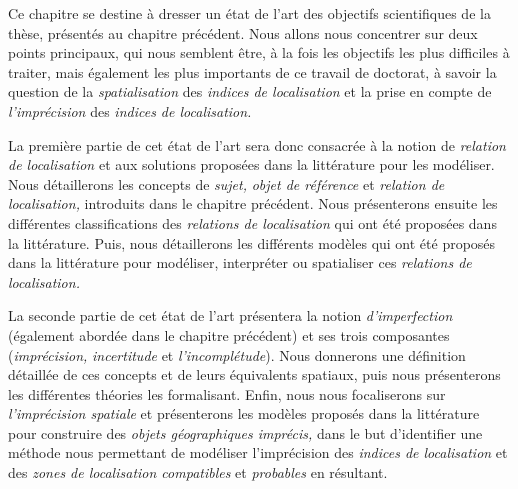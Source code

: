 Ce chapitre se destine à dresser un état de l'art des objectifs
scientifiques de la thèse, présentés au chapitre précédent. Nous
allons nous concentrer sur deux points principaux, qui nous semblent
être, à la fois les objectifs les plus difficiles à traiter, mais
également les plus importants de ce travail de doctorat, à savoir la
question de la \emph{spatialisation} des \emph{indices de
  localisation} et la prise en compte de \emph{l'imprécision} des
\emph{indices de localisation.}

La première partie de cet état de l'art sera donc consacrée à la
notion de \emph{relation de localisation} et aux solutions proposées
dans la littérature pour les modéliser. Nous détaillerons les concepts
de \emph{sujet,} \emph{objet de référence} et \emph{relation de
  localisation,} introduits dans le chapitre précédent. Nous
présenterons ensuite les différentes classifications des
\emph{relations de localisation} qui ont été proposées dans la
littérature. Puis, nous détaillerons les différents modèles qui ont
été proposés dans la littérature pour modéliser, interpréter ou
spatialiser ces \emph{relations de localisation.}

La seconde partie de cet état de l'art présentera la notion
\emph{d'imperfection} (également abordée dans le chapitre précédent)
et ses trois composantes (\emph{imprécision,} \emph{incertitude} et
\emph{l'incomplétude}). Nous donnerons une définition détaillée de ces
concepts et de leurs équivalents spatiaux, puis nous présenterons les
différentes théories les formalisant. Enfin, nous nous focaliserons
sur \emph{l'imprécision spatiale} et présenterons les modèles proposés
dans la littérature pour construire des \emph{objets géographiques
  imprécis,} dans le but d'identifier une méthode nous permettant de
modéliser l'imprécision des \emph{indices de localisation} et des
\emph{zones de localisation compatibles} et \emph{probables} en
résultant.


